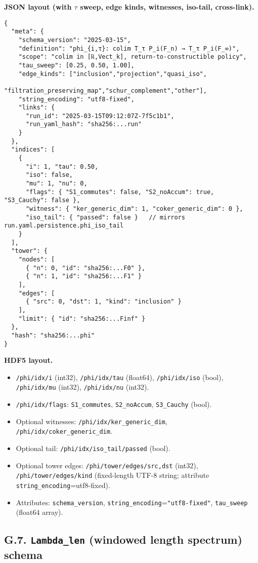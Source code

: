 \documentclass[11pt]{article}
\numberwithin{equation}{section}
\theoremstyle{plain}
\theoremstyle{definition}
\theoremstyle{remark}
\newcommand{\dq}{\textquotedbl}
\theoremstyle{plain}
\theoremstyle{definition}
\numberwithin{equation}{section}
\theoremstyle{definition}
\numberwithin{equation}{section}
\theoremstyle{plain}
\theoremstyle{definition}
\theoremstyle{remark}
\begin{document}
\noindent\textbf{JSON layout (with \(\tau\) sweep, edge kinds, witnesses, iso-tail, cross-link).}
\begin{verbatim}
{
  "meta": {
    "schema_version": "2025-03-15",
    "definition": "phi_{i,τ}: colim T_τ P_i(F_n) → T_τ P_i(F_∞)",
    "scope": "colim in [ℝ,Vect_k], return-to-constructible policy",
    "tau_sweep": [0.25, 0.50, 1.00],
    "edge_kinds": ["inclusion","projection","quasi_iso",
                   "filtration_preserving_map","schur_complement","other"],
    "string_encoding": "utf8-fixed",
    "links": {
      "run_id": "2025-03-15T09:12:07Z-7f5c1b1",
      "run_yaml_hash": "sha256:...run"
    }
  },
  "indices": [
    {
      "i": 1, "tau": 0.50,
      "iso": false,
      "mu": 1, "nu": 0,
      "flags": { "S1_commutes": false, "S2_noAccum": true, "S3_Cauchy": false },
      "witness": { "ker_generic_dim": 1, "coker_generic_dim": 0 },
      "iso_tail": { "passed": false }   // mirrors run.yaml.persistence.phi_iso_tail
    }
  ],
  "tower": {
    "nodes": [
      { "n": 0, "id": "sha256:...F0" },
      { "n": 1, "id": "sha256:...F1" }
    ],
    "edges": [
      { "src": 0, "dst": 1, "kind": "inclusion" }
    ],
    "limit": { "id": "sha256:...Finf" }
  },
  "hash": "sha256:...phi"
}
\end{verbatim}

\noindent\textbf{HDF5 layout.}
\begin{itemize}[leftmargin=1.25em]
\item \texttt{/phi/idx/i} (int32), \texttt{/phi/idx/tau} (float64),
\texttt{/phi/idx/iso} (bool), \texttt{/phi/idx/mu} (int32), \texttt{/phi/idx/nu} (int32).
\item \texttt{/phi/idx/flags}: \texttt{S1\_commutes}, \texttt{S2\_noAccum}, \texttt{S3\_Cauchy} (bool).
\item Optional witnesses: \texttt{/phi/idx/ker\_generic\_dim}, \texttt{/phi/idx/coker\_generic\_dim}.
\item Optional tail: \texttt{/phi/idx/iso\_tail/passed} (bool).
\item Optional tower edges: \texttt{/phi/tower/edges/src,dst} (int32),
\texttt{/phi/tower/edges/kind} (fixed-length UTF-8 string; attribute \texttt{string\_encoding}=\dq utf8-fixed\dq).
\item Attributes: \texttt{schema\_version}, \texttt{string\_encoding}=\texttt{"utf8-fixed"},
\texttt{tau\_sweep} (float64 array).
\end{itemize}

\subsection*{G.7. \texttt{Lambda\_len} (windowed length spectrum) schema}
\end{document}
